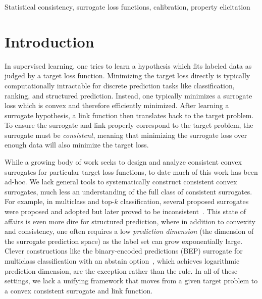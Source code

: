 \documentclass[twoside,11pt]{article}
\begin{document}
\begin{keywords}%
  Statistical consistency, surrogate loss functions, calibration, property elicitation
\end{keywords}

\section{Introduction}\label{sec:intro}


In supervised learning, one tries to learn a hypothesis which fits labeled data as judged by a target loss function.
Minimizing the target loss directly is typically computationally intractable for discrete prediction tasks like classification, ranking, and structured prediction.
Instead, one typically minimizes a surrogate loss which is convex and therefore efficiently minimized.
After learning a surrogate hypothesis, a link function then translates back to the target problem.
To ensure the surrogate and link properly correspond to the target problem, the surrogate must be \emph{consistent}, meaning that minimizing the surrogate loss over enough data will also minimize the target loss.

While a growing body of work seeks to design and analyze consistent convex surrogates for particular target loss functions, to date much of this work has been ad-hoc.
We lack general tools to systematically construct consistent convex surrogates, much less an understanding of the full class of consistent surrogates.
For example, in multiclass and top-$k$ classification, several proposed surrogates were proposed and adopted but later proved to be inconsistent~\citep{yang2018consistency,crammer2001algorithmic,rifkin2004defense}.
This state of affairs is even more dire for structured prediction, where in addition to convexity and consistency, one often requires a low \emph{prediction dimension} (the dimension of the surrogate prediction space) as the label set can grow exponentially large.
Clever constructions like the binary-encoded predictions (BEP) surrogate for multiclass classification with an abstain option~\citep{ramaswamy2018consistent}, which achieves logarithmic prediction dimension, are the exception rather than the rule.
In all of these settings, we lack a unifying framework that moves from a given target problem to a convex consistent surrogate and link function.
\end{document}
